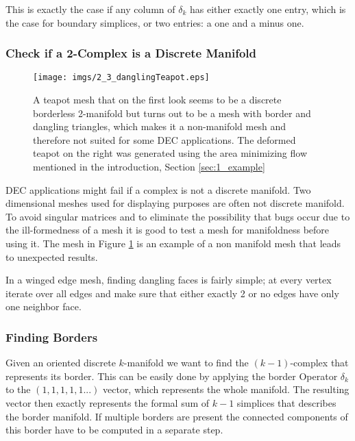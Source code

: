 This is exactly the case if any column of $\delta_k$ has either exactly one entry, which is the case for boundary simplices, or two entries: a one and a minus one. 

\subsubsection{Check if a 2-Complex is a Discrete Manifold}
\begin{figure}[tb]
	\begin{center}
	\texttt{[image: imgs/2\_3\_danglingTeapot.eps]}
	\end{center}
	\caption{A teapot mesh that on the first look seems to be a discrete borderless 2-manifold but turns out to be a mesh with border and dangling triangles, which makes it a non-manifold mesh and therefore not suited for some DEC applications. The deformed teapot on the right was generated using the area minimizing flow mentioned in the introduction, Section \ref{sec:1_example}}
	\label{fig:2_badteapot}
\end{figure}

DEC applications might fail if a complex is not a discrete manifold. Two dimensional meshes used for displaying purposes are often not discrete manifold. To avoid singular matrices and to eliminate the possibility that bugs occur due to the ill-formedness of a mesh it is good to test a mesh for manifoldness before using it. The mesh in Figure \ref{fig:2_badteapot} is an example of a non manifold mesh that leads to unexpected results.

In a winged edge mesh, finding dangling faces is fairly simple; at every vertex iterate over all edges and make sure that either exactly 2 or no edges have only one neighbor face.
	
\subsubsection{Finding Borders}
Given an oriented discrete $k$-manifold we want to find the $(k-1)$-complex that represents its border. This can be easily done by applying the border Operator $\delta_k$ to the $(1,1,1,1,1...)$ vector, which represents the whole manifold. The resulting vector then exactly represents the formal sum of $k-1$ simplices that describes the border manifold. If multiple borders are present the connected components of this border have to be computed in a separate step.
